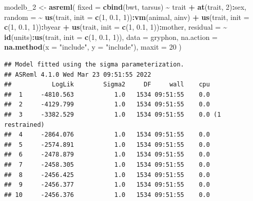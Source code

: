 \documentclass[
  12pt,
]{book}
\newenvironment{Shaded}{\begin{snugshade}}{\end{snugshade}}
\newcommand{\DataTypeTok}[1]{\textcolor[rgb]{0.13,0.29,0.53}{#1}}
\newcommand{\DecValTok}[1]{\textcolor[rgb]{0.00,0.00,0.81}{#1}}
\newcommand{\FloatTok}[1]{\textcolor[rgb]{0.00,0.00,0.81}{#1}}
\newcommand{\KeywordTok}[1]{\textcolor[rgb]{0.13,0.29,0.53}{\textbf{#1}}}
\newcommand{\NormalTok}[1]{#1}
\newcommand{\OperatorTok}[1]{\textcolor[rgb]{0.81,0.36,0.00}{\textbf{#1}}}
\newcommand{\StringTok}[1]{\textcolor[rgb]{0.31,0.60,0.02}{#1}}
\begin{document}
\begin{Shaded}
\begin{Highlighting}[]
\NormalTok{modelb\_}\DecValTok{2}\NormalTok{ \textless{}{-}}\StringTok{ }\KeywordTok{asreml}\NormalTok{(}
  \DataTypeTok{fixed =} \KeywordTok{cbind}\NormalTok{(bwt, tarsus) }\OperatorTok{\textasciitilde{}}\StringTok{ }\NormalTok{trait }\OperatorTok{+}\StringTok{ }\KeywordTok{at}\NormalTok{(trait, }\DecValTok{2}\NormalTok{)}\OperatorTok{:}\NormalTok{sex,}
  \DataTypeTok{random =} \OperatorTok{\textasciitilde{}}\StringTok{ }\KeywordTok{us}\NormalTok{(trait, }\DataTypeTok{init =} \KeywordTok{c}\NormalTok{(}\DecValTok{1}\NormalTok{, }\FloatTok{0.1}\NormalTok{, }\DecValTok{1}\NormalTok{))}\OperatorTok{:}\KeywordTok{vm}\NormalTok{(animal, ainv) }\OperatorTok{+}
\StringTok{    }\KeywordTok{us}\NormalTok{(trait, }\DataTypeTok{init =} \KeywordTok{c}\NormalTok{(}\DecValTok{1}\NormalTok{, }\FloatTok{0.1}\NormalTok{, }\DecValTok{1}\NormalTok{))}\OperatorTok{:}\NormalTok{byear }\OperatorTok{+}
\StringTok{    }\KeywordTok{us}\NormalTok{(trait, }\DataTypeTok{init =} \KeywordTok{c}\NormalTok{(}\DecValTok{1}\NormalTok{, }\FloatTok{0.1}\NormalTok{, }\DecValTok{1}\NormalTok{))}\OperatorTok{:}\NormalTok{mother,}
  \DataTypeTok{residual =} \OperatorTok{\textasciitilde{}}\StringTok{ }\KeywordTok{id}\NormalTok{(units)}\OperatorTok{:}\KeywordTok{us}\NormalTok{(trait, }\DataTypeTok{init =} \KeywordTok{c}\NormalTok{(}\DecValTok{1}\NormalTok{, }\FloatTok{0.1}\NormalTok{, }\DecValTok{1}\NormalTok{)),}
  \DataTypeTok{data =}\NormalTok{ gryphon,}
  \DataTypeTok{na.action =} \KeywordTok{na.method}\NormalTok{(}\DataTypeTok{x =} \StringTok{"include"}\NormalTok{, }\DataTypeTok{y =} \StringTok{"include"}\NormalTok{),}
  \DataTypeTok{maxit =} \DecValTok{20}
\NormalTok{)}
\end{Highlighting}
\end{Shaded}

\begin{verbatim}
## Model fitted using the sigma parameterization.
## ASReml 4.1.0 Wed Mar 23 09:51:55 2022
##           LogLik        Sigma2     DF     wall    cpu
##  1     -4810.563           1.0   1534 09:51:55    0.0
##  2     -4129.799           1.0   1534 09:51:55    0.0
##  3     -3382.529           1.0   1534 09:51:55    0.0 (1 restrained)
##  4     -2864.076           1.0   1534 09:51:55    0.0
##  5     -2574.891           1.0   1534 09:51:55    0.0
##  6     -2478.879           1.0   1534 09:51:55    0.0
##  7     -2458.305           1.0   1534 09:51:55    0.0
##  8     -2456.425           1.0   1534 09:51:55    0.0
##  9     -2456.377           1.0   1534 09:51:55    0.0
## 10     -2456.376           1.0   1534 09:51:55    0.0
\end{verbatim}
\end{document}
